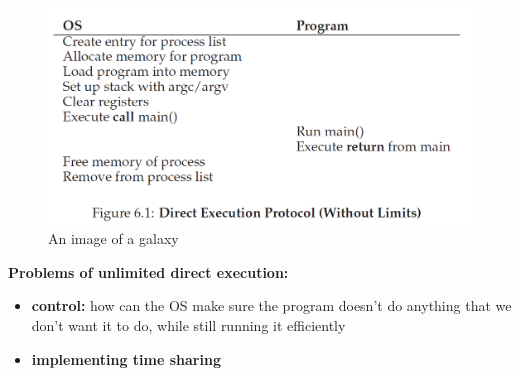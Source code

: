 \documentclass{article}
\begin{document}
\begin{figure}[H]
    \centering
    \includegraphics[width=13cm] {fig6.1.png}
    \caption{An image of a galaxy}
    \label{fig:galaxy}
\end{figure}

\textbf{Problems of unlimited direct execution:}
\begin{itemize}
    \item \textbf{control: }how can the OS make sure the program doesn’t do anything that we don’t want it to do, while still running it efficiently
    
    \item \textbf{implementing time sharing}
\end{itemize}
\end{document}

